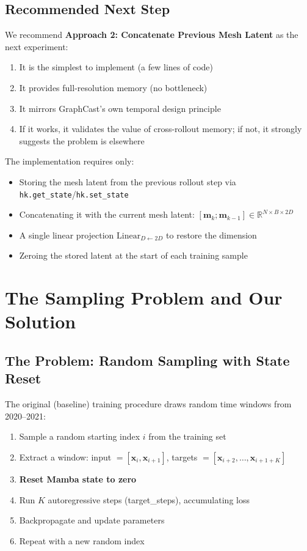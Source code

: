 \documentclass[11pt,a4paper]{article}
\begin{document}
\subsection{Recommended Next Step}

We recommend \textbf{Approach 2: Concatenate Previous Mesh Latent} as the next experiment:
\begin{enumerate}[nosep]
  \item It is the simplest to implement (a few lines of code)
  \item It provides full-resolution memory (no bottleneck)
  \item It mirrors GraphCast's own temporal design principle
  \item If it works, it validates the value of cross-rollout memory; if not, it strongly suggests the problem is elsewhere
\end{enumerate}

The implementation requires only:
\begin{itemize}[nosep]
  \item Storing the mesh latent from the previous rollout step via \texttt{hk.get\_state}/\texttt{hk.set\_state}
  \item Concatenating it with the current mesh latent: $[\mathbf{m}_k; \mathbf{m}_{k-1}] \in \mathbb{R}^{N \times B \times 2D}$
  \item A single linear projection $\text{Linear}_{D \leftarrow 2D}$ to restore the dimension
  \item Zeroing the stored latent at the start of each training sample
\end{itemize}

\section{The Sampling Problem and Our Solution}

\subsection{The Problem: Random Sampling with State Reset}

The original (baseline) training procedure draws random time windows from 2020--2021:

\begin{enumerate}[nosep]
  \item Sample a random starting index $i$ from the training set
  \item Extract a window: input $= [\mathbf{x}_i, \mathbf{x}_{i+1}]$, targets $= [\mathbf{x}_{i+2}, \ldots, \mathbf{x}_{i+1+K}]$
  \item \textbf{Reset Mamba state to zero}
  \item Run $K$ autoregressive steps (target\_steps), accumulating loss
  \item Backpropagate and update parameters
  \item Repeat with a new random index
\end{enumerate}
\end{document}

